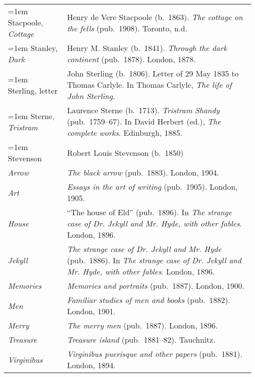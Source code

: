 \begin{xltabular}{\textwidth}{ lQ }
\hangindent=1em  Stacpoole, \textit{Cottage} & Henry de Vere Stacpoole (b.~1863). \textit{The cottage on the fells} (pub.~1908). Toronto, n.d. \\

\hangindent=1em  Stanley, \textit{Dark} & Henry M. Stanley (b.~1841). \textit{Through the dark continent} (pub.~1878). London, 1878. \\

\hangindent=1em  Sterling, letter & John Sterling (b.~1806). Letter of 29 May 1835 to Thomas Carlyle. In Thomas Carlyle, \textit{The life of John Sterling}. \\

\hangindent=1em  Sterne, \textit{Tristram} & Laurence Sterne (b.~1713). \textit{Tristram Shandy} (pub.~1759--67). In David Herbert (ed.), \textit{The complete works}. Edinburgh, 1885. \\ 

\hangindent=1em  Stevenson & Robert Louis Stevenson (b.~1850) \\
\hspace{1em}\textit{Arrow} & \textit{The black arrow} (pub.~1883). London, 1904. \\
\hspace{1em}\textit{Art} & \textit{Essays in the art of writing} (pub.~1905). London, 1905. \\
\hspace{1em}\textit{House} & ``The house of Eld'' (pub.~1896). In \textit{The strange case of Dr. Jekyll and Mr. Hyde, with other fables}. London, 1896. \\ %
\hspace{1em}\textit{Jekyll} & \textit{The strange case of Dr. Jekyll and Mr. Hyde} (pub.~1886). In \textit{The strange case of Dr. Jekyll and Mr. Hyde, with other fables}. London, 1896. \\ %
\hspace{1em}\textit{Memories} & \textit{Memories and portraits} (pub.~1887). London, 1900. \\  %
\hspace{1em}\textit{Men} & \textit{Familiar studies of men and books} (pub.~1882). London, 1901. \\
\hspace{1em}\textit{Merry} & \textit{The merry men} (pub.~1887). London, 1896.  \\
\hspace{1em}\textit{Treasure} & \textit{Treasure island} (pub.~1881--82). Tauchnitz.  \\
\hspace{1em}\textit{Virginibus} & \textit{Virginibus puerisque and other papers} (pub.~1881). London, 1894.  \\


\end{xltabular}
